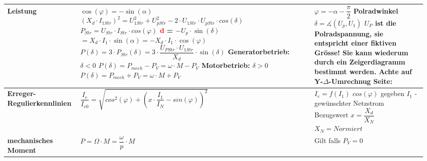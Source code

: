\begin{longtable}[b]{| C{5cm}| P{8.5cm} | P{5 cm} |}
        \textbf{Leistung} \newline %
         &
        $\cos(\varphi) = -\sin(\alpha)$ \newline\newline
       	$ (X_d \cdot I_{1Str})^2=U_{1Str}^2+U_{pStr}^2 - 2\cdot U_{1Str}\cdot U_{pStr}\cdot cos(\delta) $ \newline \newline
       	$P_{Str} = U_{Str}\cdot I_{Str}\cdot cos(\varphi)$ \newline
        \textcolor{red}{d} = $-U_p\cdot\sin(\delta)$ \newline
        \qquad $= X_d\cdot I_1\cdot\sin(\alpha) = -X_d\cdot I_1\cdot\cos(\varphi)$ \newline \newline
        $P(\delta) = 3\cdot P_{Str}(\delta)= 3\cdot\dfrac{U_{PStr}\cdot U_{1Str}}{X_d}\cdot\sin(\delta)$ \newline
        \textbf{Generatorbetrieb:} $\delta < 0$ \newline
        $P(\delta) = P_{mech}-P_V = \omega\cdot M - P_V$ \newline
        \textbf{Motorbetrieb:} $\delta > 0$ \newline
        $P(\delta) = P_{mech} + P_V = \omega\cdot M + P_V$ &
         $\varphi = -\alpha - \dfrac{\pi}{2}$ \newline \newline
        Polradwinkel $\delta =  \measuredangle (U_p, U_1)$  \newline \newline
        $U_P$ ist die Polradspannung, sie entspricht einer fiktiven Grösse! Sie kann wiederum durch ein Zeigerdiagramm bestimmt werden.\newline\newline
        \textbf{ Achte auf Y-$ \Delta $-Umrechnug} \newline
        Seite: \pageref{SternDreieck}
        \\ \hline
		\textbf{Erreger-Regulierkennlinien} & 
		$ \dfrac{I_e}{I_{e0}} = \sqrt{cos^2(\varphi) + \left(x\cdot\dfrac{I_1}{I_N}-sin(\varphi)\right)^2}$ &
        $I_e = f(I_1)$ \newline $cos(\varphi)$ gegeben \newline $I_1$ - gewünschter Netzstrom \newline Bezugswert $x = \dfrac{X_d}{X_N}$ \newline $ X_N = Normiert $
		\\ \hline
		\textbf{mechanisches Moment} &  $P = \Omega\cdot M = \dfrac{\omega}{p}\cdot M$ & Gilt falls $P_V = 0$ 
		\\ \hline	
	    \end{longtable}
    
